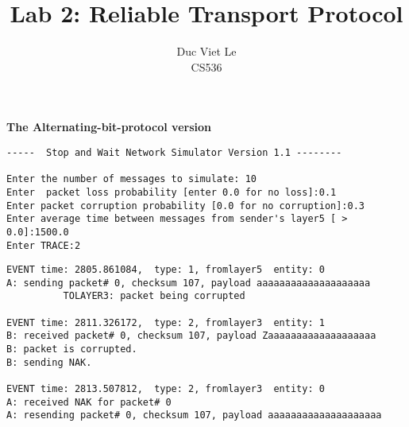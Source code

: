 \documentclass[12pt]{article}
\begin{document}
 
\title{Lab 2: Reliable Transport Protocol}
\author{Duc Viet Le\\ 
CS536}
 
\maketitle
\noindent
\large{\textbf{The Alternating-bit-protocol version}}
\normalsize

\begin{Verbatim}[frame=single, rulecolor=\color{green}, label=Input] 
-----  Stop and Wait Network Simulator Version 1.1 -------- 

Enter the number of messages to simulate: 10
Enter  packet loss probability [enter 0.0 for no loss]:0.1
Enter packet corruption probability [0.0 for no corruption]:0.3
Enter average time between messages from sender's layer5 [ > 0.0]:1500.0
Enter TRACE:2
\end{Verbatim}
\begin{Verbatim}[frame=single, rulecolor=\color{red}, label=Handle Corruption] 
EVENT time: 2805.861084,  type: 1, fromlayer5  entity: 0
A: sending packet# 0, checksum 107, payload aaaaaaaaaaaaaaaaaaaa
          TOLAYER3: packet being corrupted

EVENT time: 2811.326172,  type: 2, fromlayer3  entity: 1
B: received packet# 0, checksum 107, payload Zaaaaaaaaaaaaaaaaaaa
B: packet is corrupted.
B: sending NAK.

EVENT time: 2813.507812,  type: 2, fromlayer3  entity: 0
A: received NAK for packet# 0
A: resending packet# 0, checksum 107, payload aaaaaaaaaaaaaaaaaaaa
\end{Verbatim}
\end{document}

